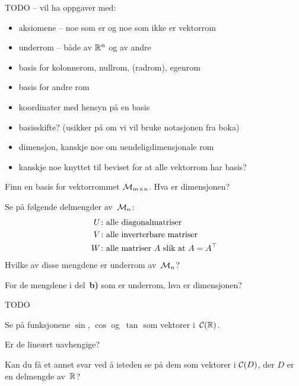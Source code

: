 

\linje
TODO --
vil ha oppgaver med:
\begin{itemize}
\item aksiomene -- noe som er og noe som ikke er vektorrom
\item underrom -- både av $\mathbb{R}^n$ og av andre
\item basis for kolonnerom, nullrom, (radrom), egenrom
\item basis for andre rom
\item koordinater med hensyn på en basis
\item basisskifte?  (usikker på om vi vil bruke notasjonen fra boka)
\item dimensjon, kanskje noe om uendeligdimensjonale rom
\item kanskje noe knyttet til beviset for at alle vektorrom har basis?
\end{itemize}
\linje


\begin{oppgave}
\begin{punkt}
Finn en basis for vektorrommet $\mathcal{M}_{m \times n}$.  Hva er dimensjonen?
\end{punkt}
\begin{punkt}
Se på følgende delmengder av~$\mathcal{M}_n$:
\begin{align*}
U \colon &\text{alle diagonalmatriser} \\
V \colon &\text{alle inverterbare matriser} \\
W \colon &\text{alle matriser~$A$ slik at $A = A^\top$}
\end{align*}
Hvilke av disse mengdene er underrom av~$\mathcal{M}_n$?
\end{punkt}
\begin{punkt}
For de mengdene i del~\textbf{b)} som er underrom, hva er dimensjonen?
\end{punkt}
\end{oppgave}

\begin{losning}
TODO
\end{losning}


\begin{oppgave}
Se på funksjonene $\sin$, $\cos$ og~$\tan$ som vektorer i~$\mathcal{C}(\mathbb{R})$.
\begin{punkt}
Er de lineært uavhengige?
\end{punkt}
\begin{punkt}
Kan du få et annet svar ved å isteden se på dem som vektorer i
$\mathcal{C}(D)$, der $D$ er en delmengde av~$\mathbb{R}$?
\end{punkt}
\end{oppgave}

